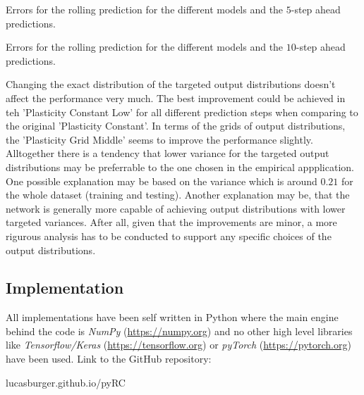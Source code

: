 \begin{table}[H]
    \begin{center}
        
    \end{center}
    \caption{Errors for the rolling  prediction for the different models and the $5$-step ahead predictions.}
    \label{TABLE:Appendix:5step}
\end{table} 

\begin{table}[H]
    \begin{center}
        
    \end{center}
    \caption{Errors for the rolling  prediction for the different models and the $10$-step ahead predictions.}
    \label{TABLE:Appendix:10step}
\end{table} 

Changing the exact distribution of the targeted output distributions doesn't affect the performance very much. The best improvement could be achieved in teh 'Plasticity Constant Low' for all different prediction steps when comparing to the original 'Plasticity Constant'. In terms of the grids of output distributions, the 'Plasticity Grid Middle' seems to improve the performance slightly. Alltogether there is a tendency that lower variance for the targeted output distributions may be preferrable to the one chosen in the empirical appplication. One possible explanation may be based on the variance which is around $0.21$ for the whole dataset (training and testing). Another explanation may be, that the network is generally more capable of achieving output distributions with lower targeted variances. After all, given that the improvements are minor, a more rigurous analysis has to be conducted to support any specific choices of the output distributions.


\subsection{Implementation}
All implementations have been self written in Python where the main engine behind the code is \textit{NumPy} (\url{https://numpy.org}) and no other high level libraries like \textit{Tensorflow/Keras} (\url{https://tensorflow.org}) or \textit{pyTorch} (\url{https://pytorch.org}) have been used.
Link to the GitHub repository:
\begin{center}
    lucasburger.github.io/pyRC
\end{center}


